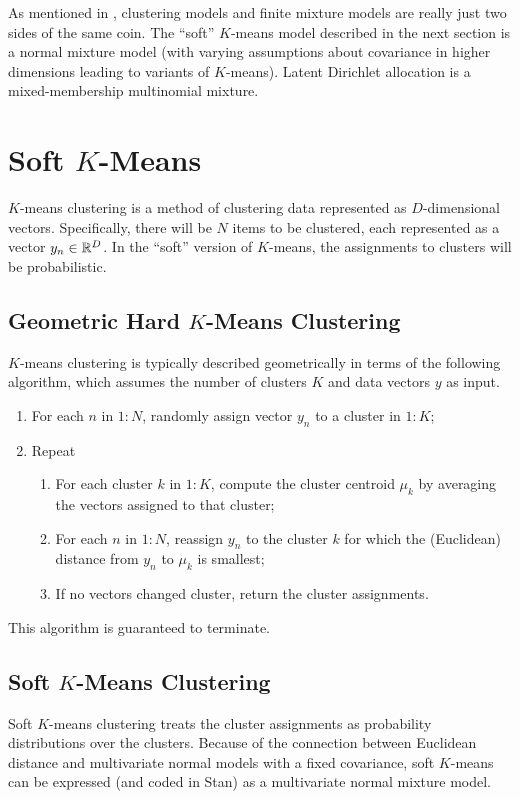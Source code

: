 As mentioned in , clustering models and
finite mixture models are really just two sides of the same coin.  The
``soft'' $K$-means model described in the next section is a normal
mixture model (with varying assumptions about covariance in higher
dimensions leading to variants of $K$-means).  Latent Dirichlet
allocation is a mixed-membership multinomial mixture.

\section{Soft $K$-Means}

$K$-means clustering is a method of clustering data represented as
$D$-dimensional vectors.  Specifically, there will be $N$ items to be
clustered, each represented as a vector $y_n \in \reals^D$.  In the
``soft'' version of $K$-means, the assignments to clusters will be
probabilistic.  

\subsection{Geometric Hard  $K$-Means Clustering}

$K$-means clustering is typically described geometrically in terms of
the following algorithm, which assumes the number of clusters $K$ and
data vectors $y$ as input.
%
\begin{enumerate}
\item For each $n$ in $1:N$, randomly assign vector $y_n$ to a cluster in $1{:}K$;
\item Repeat
\begin{enumerate} 
\item For each cluster $k$ in $1{:}K$, compute the cluster centroid $\mu_k$  by averaging the
  vectors assigned to that cluster;
\item For each $n$ in $1:N$, reassign $y_n$ to the cluster $k$
  for which the (Euclidean) distance from $y_n$ to $\mu_k$ is smallest;
\item If no vectors changed cluster, return the cluster assignments.
\end{enumerate}
\end{enumerate}
%
This algorithm is guaranteed to terminate.

\subsection{Soft $K$-Means Clustering}

Soft $K$-means clustering treats the cluster assignments as
probability distributions over the clusters.  Because of the
connection between Euclidean distance and multivariate normal models
with a fixed covariance, soft $K$-means can be expressed (and coded in
Stan) as a multivariate normal mixture model.

